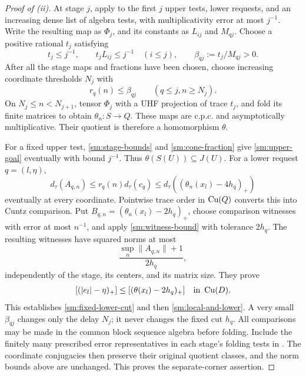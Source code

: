\begin{proof}[Proof of \textup{(ii)}]
At stage \(j\), apply  to the first
\(j\) upper tests, lower requests, and an increasing dense
list of algebra tests, with multiplicativity error at most
\(j^{-1}\).  Write the resulting map as \(\Phi_j\),
and its constants as \(L_{ij}\) and \(M_{qj}\).
Choose a positive rational \(t_j\) satisfying
\begin{equation}\label{sm:cone-fraction}
 t_j\leq j^{-1},
 \qquad t_jL_{ij}\leq j^{-1}\quad(i\leq j),
 \qquad \beta_{qj}:=t_j/M_{qj}>0.
\end{equation}
After all the stage maps and fractions have been chosen,
choose increasing coordinate thresholds \(N_j\) with
\begin{equation}\label{sm:cone-delay}
 r_q(n)\leq\beta_{qj}
 \qquad(q\leq j, n\geq N_j).
\end{equation}
On \(N_j\leq n<N_{j+1}\), tensor \(\Phi_j\) with a UHF
projection of trace \(t_j\), and fold its finite matrices
to obtain \(\theta_n:S\to Q\).
These maps are c.p.c. and asymptotically multiplicative.
Their quotient is therefore a homomorphism \(\theta\).

For a fixed upper test, \eqref{sm:stage-bounds} and
\eqref{sm:cone-fraction} give
\eqref{sm:upper-goal} eventually with bound \(j^{-1}\).
Thus \(\theta(S(U))\subseteq J(U)\).
For a lower request \(q=(l,\eta)\),
\begin{equation}\label{sm:cone-coordinate-comparison}
 d_\tau(A_{q,n})
 \leq r_q(n)d_\tau(c_q)
 \leq d_\tau((\theta_n(x_l)-4h_q)_+)
\end{equation}
eventually at every coordinate.  Pointwise trace order in
\(\operatorname{Cu}(Q)\) converts this into Cuntz comparison.
Put \(B_{q,n}=(\theta_n(x_l)-2h_q)_+\), choose comparison
witnesses with error at most \(n^{-1}\), and apply
\eqref{sm:witness-bound} with tolerance \(2h_q\).
The resulting witnesses have squared norms at most
\[
 \frac{\sup_n\|A_{q,n}\|+1}{2h_q},
\]
independently of the stage, its centers, and its matrix size.
They prove
\[
 [(|e_l|-\eta)_+]
 \leq[(\theta(x_l)-2h_q)_+]
 \quad\text{in }\operatorname{Cu}(D).
\]
This establishes \eqref{sm:fixed-lower-cut} and then
\eqref{sm:local-and-lower}.  A very small \(\beta_{qj}\)
changes only the delay \(N_j\); it never changes the fixed
cut \(h_q\).
All comparisons may be made in the common block sequence
algebra before folding.  Include the finitely many prescribed
error representatives in each stage's folding tests in
.  The coordinate conjugacies then preserve
their original quotient classes, and the norm bounds above
are unchanged.  This proves the separate-corner assertion.
\end{proof}

